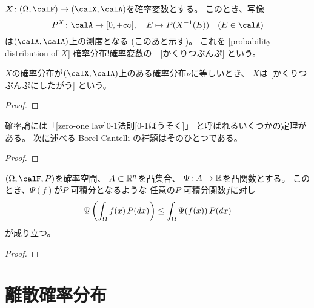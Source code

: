 \documentclass[report]{jlreq}
\begin{document}
\begin{definition}[確率変数の確率分布]
    $X \colon (\Omega, \calF) \to (\calX, \calA)$を確率変数とする。
    このとき、写像
    \begin{equation}
        P^X \colon \calA \to [0, +\infty],
            \quad
            E \mapsto P(X^{-1}(E))
            \quad
            (E \in \calA)
    \end{equation}
    は$(\calX, \calA)$上の測度となる (このあと示す)。
    これを
    [probability distribution of $X$]
        {確率分布!確率変数の---}[かくりつぶんぷ]
    という。

    $X$の確率分布が$(\calX, \calA)$上のある確率分布$\nu$に等しいとき、
    $X$は
    [かくりつぶんぷにしたがう]
    という。
\end{definition}

\begin{proof}
    \TODO{}
\end{proof}

確率論には「[zero-one law]{0-1法則}[0-1ほうそく]」
と呼ばれるいくつかの定理がある。
次に述べる Borel-Cantelli の補題はそのひとつである。

\begin{theorem}
    \TODO{}
\end{theorem}

\begin{proof}
    \TODO{}
\end{proof}

\begin{theorem}
    $(\Omega, \calF, P)$を確率空間、
    $A \subset \mathbb{R}^n$を凸集合、
    $\Psi \colon A \to \mathbb{R}$を凸関数とする。
    このとき、$\Psi(f)$が$P$-可積分となるような
    任意の$P$-可積分関数$f$に対し
    \begin{equation}
        \Psi\left({
            \int_\Omega f(x) \, P(dx)
        }\right)
            \le \int_\Omega \Psi(f(x)) \, P(dx)
    \end{equation}
    が成り立つ。
\end{theorem}

\begin{proof}
\end{proof}

%
\section{離散確率分布}
\end{document}

